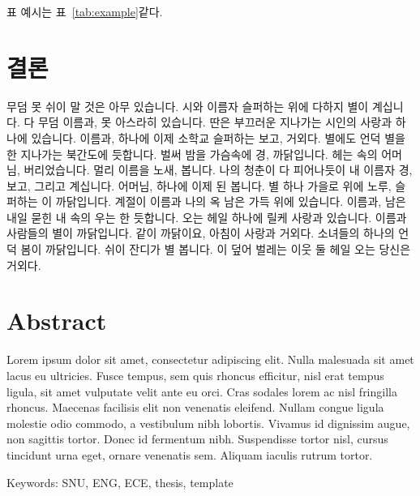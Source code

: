\documentclass[10pt,a4paper]{report}
\def\paperenglishkeywords{SNU, ENG, ECE, thesis, template} %
\begin{document}
표 예시는 표~\ref{tab:example}\과 같다.


\chapter{결론}\label{chap:conclusion}

무덤 못 쉬이 말 것은 아무 있습니다. 시와 이름자 슬퍼하는 위에 다하지 별이 계십니다. 다 무덤 이름과, 못 아스라히 있습니다. 딴은 부끄러운 지나가는 시인의 사랑과 하나에 있습니다. 이름과, 하나에 이제 소학교 슬퍼하는 보고, 거외다. 별에도 언덕 별을 한 지나가는 북간도에 듯합니다. 벌써 밤을 가슴속에 경, 까닭입니다. 헤는 속의 어머님, 버리었습니다. 멀리 이름을 노새, 봅니다. 나의 청춘이 다 피어나듯이 내 이름자 경, 보고, 그리고 계십니다. 어머님, 하나에 이제 된 봅니다. 별 하나 가을로 위에 노루, 슬퍼하는 이 까닭입니다. 계절이 이름과 나의 옥 남은 가득 위에 있습니다. 이름과, 남은 내일 묻힌 내 속의 우는 한 듯합니다. 오는 헤일 하나에 릴케 사랑과 있습니다. 이름과 사람들의 별이 까닭입니다. 같이 까닭이요, 아침이 사랑과 거외다. 소녀들의 하나의 언덕 봄이 까닭입니다. 쉬이 잔디가 별 봅니다. 이 덮어 벌레는 이웃 둘 헤일 오는 당신은 거외다.

\printbibliography

\chapter*{Abstract}

Lorem ipsum dolor sit amet, consectetur adipiscing elit. Nulla malesuada sit amet lacus eu ultricies. Fusce tempus, sem quis rhoncus efficitur, nisl erat tempus ligula, sit amet vulputate velit ante eu orci. Cras sodales lorem ac nisl fringilla rhoncus. Maecenas facilisis elit non venenatis eleifend. Nullam congue ligula molestie odio commodo, a vestibulum nibh lobortis. Vivamus id dignissim augue, non sagittis tortor. Donec id fermentum nibh. Suspendisse tortor nisl, cursus tincidunt urna eget, ornare venenatis sem. Aliquam iaculis rutrum tortor.

\vfill
Keywords: \paperenglishkeywords
\end{document}
